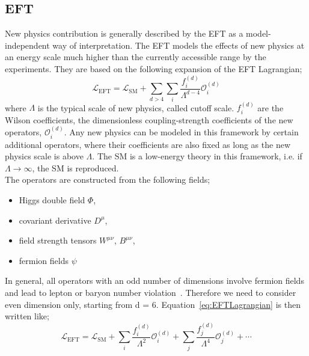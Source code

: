 \subsection{EFT}
\label{subsec:EFT}
New physics contribution is generally described by the EFT as a model-independent way of interpretation.
The EFT models the effects of new physics at an energy scale much higher than the currently accessible range by the experiments. 
They are based on the following expansion of the EFT Lagrangian;
\begin{equation}
\label{eq:EFTLagrangian}
\mathcal{L}_{\mathrm{EFT}}=\mathcal{L}_{\mathrm{SM}}+\sum_{d>4} \sum_{i} \frac{f_{i}^{(d)}}{\Lambda^{d-4}} \mathcal{O}_{i}^{(d)}
\end{equation}
where $\Lambda$ is the typical scale of new physics, called cutoff scale. 
$f_{i}^{(d)}$ are the Wilson coefficients, the dimensionless coupling-strength coefficients of the new operators, $\mathcal{O}_{i}^{(d)}$.
Any new physics can be modeled in this framework by certain additional operators, where their coefficients are also fixed as long as the new physics scale is above $\Lambda$. 
The SM is a low-energy theory in this framework, i.e. if $\Lambda \rightarrow \infty$, the SM is reproduced.
\\
The operators are constructed from the following fields;
\begin{itemize}
    \item Higgs double field $\Phi$,
    \item covariant derivative $D^{\mu}$,
    \item field strength tensors $W^{\mu\nu}$, $B^{\mu\nu}$,
    \item fermion fields $\psi$
\end{itemize}
In general, all operators with an odd number of dimensions involve fermion fields and lead to lepton or baryon number violation~\cite{PhysRevLett.43.1566}. Therefore we need to consider even dimension only, starting from d = 6.
Equation~\ref{eq:EFTLagrangian} is then written like;
\begin{equation}
\label{eq:EFTLagrangian2}
\mathcal{L}_{\mathrm{EFT}}=\mathcal{L}_{\mathrm{SM}} + \sum_{i} \frac{f_{i}^{(d)}}{\Lambda^{2}} \mathcal{O}_{i}^{(d)} +  \sum_{j} \frac{f_{j}^{(d)}}{\Lambda^{4}} \mathcal{O}_{j}^{(d)} + \cdots
\end{equation}
